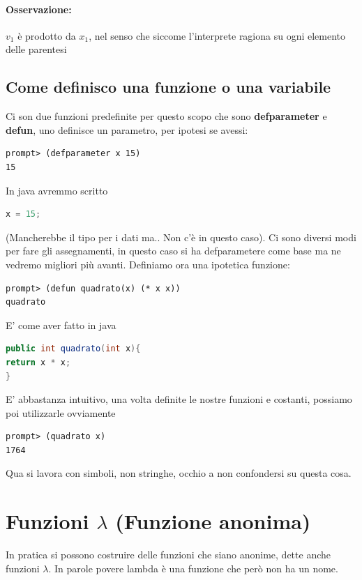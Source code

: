 \documentclass[12pt, a4paper, openany, oneside]{book}
\begin{document}
\paragraph{Osservazione: }$v_{1}$ è prodotto da $x_{1}$, nel senso che 
siccome l'interprete ragiona su ogni elemento delle parentesi
\subsection{Come definisco una funzione o una variabile}
Ci son due funzioni predefinite per questo scopo che sono \textbf{defparameter}
e \textbf{defun}, uno definisce un parametro, per ipotesi se avessi:
\begin{lstlisting}[language=LISP]
prompt> (defparameter x 15)
15
\end{lstlisting}
In java avremmo scritto
\begin{lstlisting}[language=Java]
x = 15;
\end{lstlisting}
(Mancherebbe il tipo per i dati ma.. Non c'è in questo caso). Ci sono diversi 
modi per fare gli assegnamenti, in questo caso si ha defparametere come base ma 
ne vedremo migliori più avanti.
Definiamo ora una ipotetica funzione: 
\begin{lstlisting}[language=LISP]
prompt> (defun quadrato(x) (* x x))
quadrato
\end{lstlisting}
E' come aver fatto in java
\begin{lstlisting}[language=Java]
public int quadrato(int x){
return x * x;
}
\end{lstlisting}
E' abbastanza intuitivo, una volta definite le nostre funzioni e costanti, 
possiamo poi utilizzarle ovviamente
\begin{lstlisting}[language=LISP]
prompt> (quadrato x)
1764
\end{lstlisting}
Qua si lavora con simboli, non stringhe, occhio a non confondersi su questa cosa.
\section{Funzioni $\lambda$ (Funzione anonima)}
In pratica si possono costruire delle funzioni che siano anonime, dette anche 
funzioni $\lambda$. 
In parole povere lambda è una funzione che però non ha un nome. 
\end{document}

